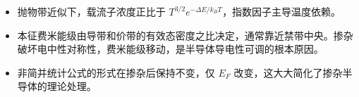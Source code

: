 \begin{insightbox}[物理图像]
\begin{itemize}
    \item 抛物带近似下，载流子浓度正比于 $T^{3/2}e^{-\Delta E/k_BT}$，指数因子主导温度依赖。
    \item 本征费米能级由导带和价带的有效态密度之比决定，通常靠近禁带中央。掺杂破坏电中性对称性，费米能级移动，是半导体导电性可调的根本原因。
    \item 非简并统计公式的形式在掺杂后保持不变，仅 $E_F$ 改变，这大大简化了掺杂半导体的理论处理。
\end{itemize}
\end{insightbox}

